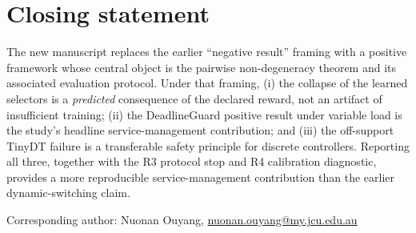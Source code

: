\documentclass[11pt]{article}
\begin{document}
\section*{Closing statement}
The new manuscript replaces the earlier ``negative result'' framing with a positive framework whose central object is the pairwise non-degeneracy theorem and its associated evaluation protocol. Under that framing, (i) the collapse of the learned selectors is a \emph{predicted} consequence of the declared reward, not an artifact of insufficient training; (ii) the DeadlineGuard positive result under variable load is the study's headline service-management contribution; and (iii) the off-support TinyDT failure is a transferable safety principle for discrete controllers. Reporting all three, together with the R3 protocol stop and R4 calibration diagnostic, provides a more reproducible service-management contribution than the earlier dynamic-switching claim.

\vspace{6pt}
Corresponding author: Nuonan Ouyang, \href{mailto:nuonan.ouyang@my.jcu.edu.au}{nuonan.ouyang@my.jcu.edu.au}
\end{document}
